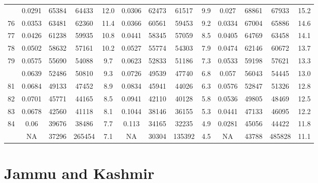 \documentclass[
  14pt,
]{article}
\begin{document}
\begin{longtable}[t]{lcccccccccccc}
\addlinespace
75 & 0.0291 & 65384 & 64433 & 12.0 & 0.0306 & 62473 & 61517 & 9.9 & 0.027 & 68861 & 67933 & 15.2\\
76 & 0.0353 & 63481 & 62360 & 11.4 & 0.0366 & 60561 & 59453 & 9.2 & 0.0334 & 67004 & 65886 & 14.6\\
77 & 0.0426 & 61238 & 59935 & 10.8 & 0.0441 & 58345 & 57059 & 8.5 & 0.0405 & 64769 & 63458 & 14.1\\
78 & 0.0502 & 58632 & 57161 & 10.2 & 0.0527 & 55774 & 54303 & 7.9 & 0.0474 & 62146 & 60672 & 13.7\\
79 & 0.0575 & 55690 & 54088 & 9.7 & 0.0623 & 52833 & 51186 & 7.3 & 0.0533 & 59198 & 57621 & 13.3\\
\addlinespace
80 & 0.0639 & 52486 & 50810 & 9.3 & 0.0726 & 49539 & 47740 & 6.8 & 0.057 & 56043 & 54445 & 13.0\\
81 & 0.0684 & 49133 & 47452 & 8.9 & 0.0834 & 45941 & 44026 & 6.3 & 0.0576 & 52847 & 51326 & 12.8\\
82 & 0.0701 & 45771 & 44165 & 8.5 & 0.0941 & 42110 & 40128 & 5.8 & 0.0536 & 49805 & 48469 & 12.5\\
83 & 0.0678 & 42560 & 41118 & 8.1 & 0.1044 & 38146 & 36155 & 5.3 & 0.0441 & 47133 & 46095 & 12.2\\
84 & 0.06 & 39676 & 38486 & 7.7 & 0.113 & 34165 & 32235 & 4.9 & 0.0281 & 45056 & 44422 & 11.8\\
\addlinespace
85 & NA & 37296 & 265454 & 7.1 & NA & 30304 & 135392 & 4.5 & NA & 43788 & 485828 & 11.1\\*
\end{longtable}

\pagebreak

\hypertarget{jammu-and-kashmir}{%
\section{Jammu and Kashmir}\label{jammu-and-kashmir}}
\end{document}
